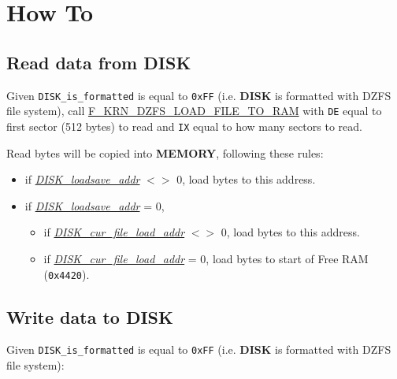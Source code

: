\documentclass[a4paper,11pt]{article}
\begin{document}
    \pagebreak
    \section{How To}

    \subsection{Read data from DISK}
    \label{sec:howto_readdata}
    Given \texttt{DISK\_is\_formatted} is equal to \texttt{0xFF} (i.e.
    \textbf{DISK} is formatted with DZFS file system), call
    \hyperref[func:fkrndzfsloadfiletoram]{F\_KRN\_DZFS\_LOAD\_FILE\_TO\_RAM}
    with \texttt{DE} equal to first sector (512 bytes) to read and \texttt{IX}
    equal to how many sectors to read.

    Read bytes will be copied into \textbf{MEMORY}, following these rules:

    \begin{itemize}
        \item if \textit{\hyperref[sec:ram_memmap]{DISK\_loadsave\_addr}} $<>$
        0, load bytes to this address.
        \item if \textit{\hyperref[sec:ram_memmap]{DISK\_loadsave\_addr}} = 0,
        \begin{itemize}
            \item if \textit{\hyperref[sec:ram_memmap]{DISK\_cur\_file\_load\_addr}}
            $<>$ 0, load bytes to this address.
            \item if \textit{\hyperref[sec:ram_memmap]{DISK\_cur\_file\_load\_addr}}
            = 0, load bytes to start of Free RAM (\texttt{0x4420}).
        \end{itemize}
    \end{itemize}

    \subsection{Write data to DISK}
    \label{sec:howto_writedata}
    Given \texttt{DISK\_is\_formatted} is equal to \texttt{0xFF} (i.e.
    \textbf{DISK} is formatted with DZFS file system):
\end{document}
